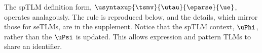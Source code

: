 \documentclass[acmsmall,10pt,review,anonymous]{acmart}\settopmatter{printfolios=true}
\begin{document}
The spTLM definition form, $\usyntaxup{\tsmv}{\utau}{\eparse}{\ue}$, operates analagously. The rule is reproduced below, and the details, which mirror those for seTLMs, are in the supplement. Notice that the spTLM context, $\uPhi$, rather than the $\uPsi$ is updated. This allows expression and pattern TLMs to share an identifier.
\begin{mathpar}
\end{mathpar}


\end{document}
